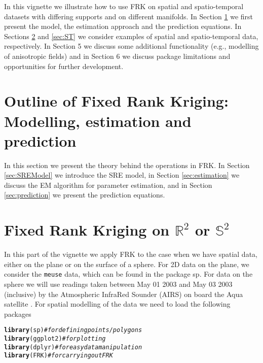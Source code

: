 \documentclass{article}\usepackage[]{graphicx}\usepackage[]{color}
\makeatletter
\newcommand{\hlcom}[1]{\textcolor[rgb]{0.678,0.584,0.686}{\textit{#1}}}%
\newcommand{\hlstd}[1]{\textcolor[rgb]{0.345,0.345,0.345}{#1}}%
\newcommand{\hlkwd}[1]{\textcolor[rgb]{0.737,0.353,0.396}{\textbf{#1}}}%
\newenvironment{kframe}{%
 \def\at@end@of@kframe{}%
 \ifinner\ifhmode%
  \def\at@end@of@kframe{\end{minipage}}%
  \begin{minipage}{\columnwidth}%
 \fi\fi%
 \def\FrameCommand##1{\hskip\@totalleftmargin \hskip-\fboxsep
 \colorbox{shadecolor}{##1}\hskip-\fboxsep
     \hskip-\linewidth \hskip-\@totalleftmargin \hskip\columnwidth}%
 \MakeFramed {\advance\hsize-\width
   \@totalleftmargin\z@ \linewidth\hsize
   \@setminipage}}%
 {\par\unskip\endMakeFramed%
 \at@end@of@kframe}
\newenvironment{knitrout}{}{} %
\newcommand{\pkg}[1]{{\fontseries{b}\selectfont #1}}
\makeatother
\begin{document}
In this vignette we illustrate how to use \pkg{FRK} on spatial and spatio-temporal datasets with differing supports and on different manifolds. In Section \ref{sec:theory} we first present the model, the estimation approach and the prediction equations. In Sections \ref{sec:Examples1} and \ref{sec:ST} we consider examples of spatial and spatio-temporal data, respectively. In Section 5 we discuss some additional functionality (e.g., modelling of anisotropic fields) and in Section 6 we discuss package limitations and opportunities for further development.




\section{Outline of Fixed Rank Kriging: Modelling, estimation and prediction} \label{sec:theory}

In this section we present the theory behind the operations in \pkg{FRK}. In Section \ref{sec:SREModel} we introduce the SRE model, in Section \ref{sec:estimation} we discuss the EM algorithm for parameter estimation, and in Section \ref{sec:prediction} we present the prediction equations.



\section{Fixed Rank Kriging on $\mathbb{R}^2$ or $\mathbb{S}^2$}\label{sec:Examples1}

In this part of the vignette we apply \pkg{FRK} to the case when we have spatial data, either on the plane or on the surface of a sphere. For 2D data on the plane, we consider the \texttt{meuse} data, which can be found in the package \pkg{sp}. For data on the sphere we will use readings taken between May 01 2003 and May 03 2003 (inclusive) by the Atmospheric InfraRed Sounder (AIRS) on board the Aqua satellite \citep[e.g.,][]{Chahine_2006}. For spatial modelling of the data we need to load the following packages
\begin{knitrout}
\color{fgcolor}\begin{kframe}
\begin{alltt}
\hlkwd{library}\hlstd{(sp)}        \hlcom{# for defining points/polygons}
\hlkwd{library}\hlstd{(ggplot2)}   \hlcom{# for plotting}
\hlkwd{library}\hlstd{(dplyr)}     \hlcom{# for easy data manipulation}
\hlkwd{library}\hlstd{(FRK)}       \hlcom{# for carrying out FRK}
\end{alltt}
\end{kframe}
\end{knitrout}
\end{document}
